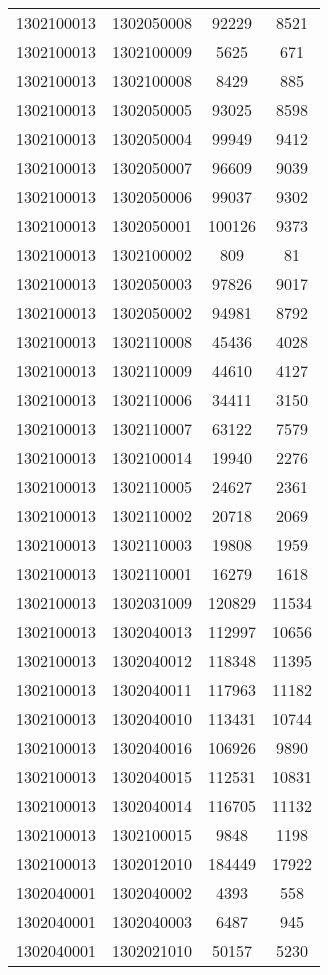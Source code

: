 \begin{longtable}{llcc}
1302100013 & 1302050008 & 92229 & 8521\\
1302100013 & 1302100009 & 5625 & 671\\
1302100013 & 1302100008 & 8429 & 885\\
1302100013 & 1302050005 & 93025 & 8598\\
1302100013 & 1302050004 & 99949 & 9412\\
1302100013 & 1302050007 & 96609 & 9039\\
1302100013 & 1302050006 & 99037 & 9302\\
1302100013 & 1302050001 & 100126 & 9373\\
1302100013 & 1302100002 & 809 & 81\\
1302100013 & 1302050003 & 97826 & 9017\\
1302100013 & 1302050002 & 94981 & 8792\\
1302100013 & 1302110008 & 45436 & 4028\\
1302100013 & 1302110009 & 44610 & 4127\\
1302100013 & 1302110006 & 34411 & 3150\\
1302100013 & 1302110007 & 63122 & 7579\\
1302100013 & 1302100014 & 19940 & 2276\\
1302100013 & 1302110005 & 24627 & 2361\\
1302100013 & 1302110002 & 20718 & 2069\\
1302100013 & 1302110003 & 19808 & 1959\\
1302100013 & 1302110001 & 16279 & 1618\\
1302100013 & 1302031009 & 120829 & 11534\\
1302100013 & 1302040013 & 112997 & 10656\\
1302100013 & 1302040012 & 118348 & 11395\\
1302100013 & 1302040011 & 117963 & 11182\\
1302100013 & 1302040010 & 113431 & 10744\\
1302100013 & 1302040016 & 106926 & 9890\\
1302100013 & 1302040015 & 112531 & 10831\\
1302100013 & 1302040014 & 116705 & 11132\\
1302100013 & 1302100015 & 9848 & 1198\\
1302100013 & 1302012010 & 184449 & 17922\\
1302040001 & 1302040002 & 4393 & 558\\
1302040001 & 1302040003 & 6487 & 945\\
1302040001 & 1302021010 & 50157 & 5230\\

\end{longtable}
